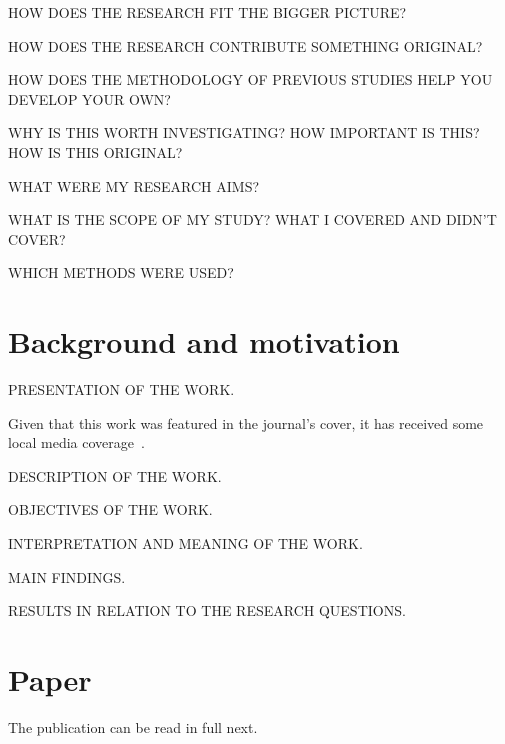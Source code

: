 HOW DOES THE RESEARCH FIT THE BIGGER PICTURE?\@

HOW DOES THE RESEARCH CONTRIBUTE SOMETHING ORIGINAL?\@

HOW DOES THE METHODOLOGY OF PREVIOUS STUDIES HELP YOU DEVELOP YOUR OWN?\@








WHY IS THIS WORTH INVESTIGATING?\@
HOW IMPORTANT IS THIS?\@
HOW IS THIS ORIGINAL?\@

WHAT WERE MY RESEARCH AIMS?\@

WHAT IS THE SCOPE OF MY STUDY?\@
WHAT I COVERED AND DIDN'T COVER?\@

WHICH METHODS WERE USED?\@





\section{Background and motivation}

PRESENTATION OF THE WORK.\@

Given that this work was featured in the journal's cover, it has received some local media coverage~\cite{noticias-da-ufsc2020}.

DESCRIPTION OF THE WORK.\@

OBJECTIVES OF THE WORK.\@

INTERPRETATION AND MEANING OF THE WORK.\@

MAIN FINDINGS.\@

RESULTS IN RELATION TO THE RESEARCH QUESTIONS.\@

\section{Paper}

The publication can be read in full next.


